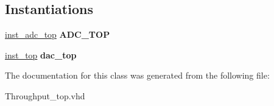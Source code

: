 \subsection*{Instantiations}
 \begin{DoxyCompactItemize}
\item 
\hypertarget{class_throughput__top_1_1_behavioral_af3a42d0acd19aeab2e861d729423303a}{\hyperlink{class_throughput__top_1_1_behavioral_af3a42d0acd19aeab2e861d729423303a}{inst\-\_\-adc\-\_\-top}  {\bfseries A\-D\-C\-\_\-\-T\-O\-P}   }\label{class_throughput__top_1_1_behavioral_af3a42d0acd19aeab2e861d729423303a}

\item 
\hypertarget{class_throughput__top_1_1_behavioral_af8047950a8cbc047aafda26366d23dcd}{\hyperlink{class_throughput__top_1_1_behavioral_af8047950a8cbc047aafda26366d23dcd}{inst\-\_\-top}  {\bfseries dac\-\_\-top}   }\label{class_throughput__top_1_1_behavioral_af8047950a8cbc047aafda26366d23dcd}

\end{DoxyCompactItemize}


The documentation for this class was generated from the following file\-:\begin{DoxyCompactItemize}
\item 
Throughput\-\_\-top.\-vhd\end{DoxyCompactItemize}
